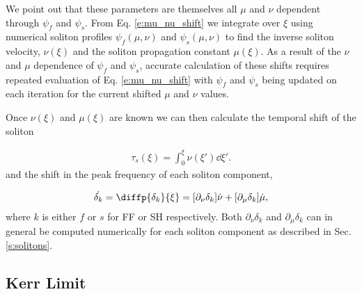 \documentclass[reprint,
 amsmath,amssymb,
 pra,
]{revtex4-1}
\newcommand{\eq}[1]{
\begin{equation}\begin{aligned}
#1
\end{aligned}\end{equation}}
\begin{document}
We point out that these parameters are themselves all $\mu$ and $\nu$ dependent through $\psi_f$ and $\psi_s$.
From Eq. \eqref{e:mu_nu_shift} we integrate over $\xi$ using numerical soliton profiles $\psi_f(\mu, \nu)$ and $\psi_s(\mu, \nu)$ to find the inverse soliton velocity, $\nu(\xi)$ and the soliton propagation constant $\mu(\xi)$. As a result of the $\nu$ and $\mu$ dependence of $\psi_f$ and $\psi_s$, accurate calculation of these shifts requires repeated evaluation of Eq. \eqref{e:mu_nu_shift} with $\psi_f$ and $\psi_s$ being updated on each iteration for the current shifted $\mu$ and $\nu$ values.

Once $\nu(\xi)$ and $\mu(\xi)$ are known we can then calculate the temporal shift of the soliton 
\eq{\label{e:time_shift}
\tau_s(\xi) = \int_0^\xi \nu(\xi') \dd \xi'.
}
and the shift in the peak frequency of each soliton component,
\eq{\label{e:freq_shift}
\dot{\delta_k} = \diffp{\delta_k}{\xi} = [\partial_\nu \delta_k] \dot{\nu} + [\partial_\mu \delta_k] \dot{\mu},
}
where $k$ is either $f$ or $s$ for FF or SH respectively. Both $\partial_\nu \delta_k$ and $\partial_\mu \delta_k$ can in general be computed numerically for each soliton component as described in Sec. \ref{s:solitons}. 


\subsection{Kerr Limit} 
\end{document}
